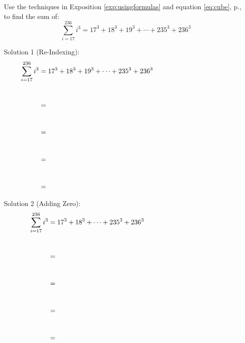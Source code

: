 \begin{practiceprob}
Use the techniques in Exposition \ref{exp:usingformulas} and equation \ref{eq:cube}, p.\pageref{eq:cube}, to find the sum of:
    \[\sum_{i=17}^{236} i^3 = 17^3+18^3+19^3+\cdots+235^3+236^3\]

Solution 1 (Re-Indexing):
\begin{align*}
    \sum_{i=17}^{236} i^3 &= 17^3+18^3+19^3+\cdots+235^3+236^3\hspace{0.33\textwidth}\\[25pt]
        &=\\[25pt]
        &=\\[25pt]
        &=\\[25pt]
        &=
\end{align*}\vspace{20pt}

Solution 2 (Adding Zero):
\begin{align*}
    \sum_{i=17}^{236} i^3 &= 17^3+18^3+\cdots+235^3+236^3\hspace{0.33\textwidth}\\[25pt]
        &=\\[25pt]
        &=\\[25pt]
        &=\\[25pt]
        &=
\end{align*}\vspace{20pt}

\end{practiceprob}

\clearpage


